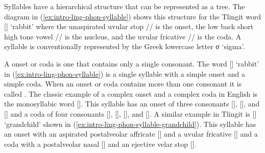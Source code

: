 Syllables have a hierarchical structure that can be represented as a tree.
The diagram in (\ref{ex:intro-ling-phon-syllable}) shows this structure for the Tlingit word  [] ‘rabbit’ where the unaspirated uvular stop // is the onset, the low back short high tone vowel // is the nucleus, and the uvular fricative // is the coda.
A syllable is conventionally represented by the Greek lowercase letter σ ‘sigma’.

\ex\label{ex:intro-ling-phon-syllable}%
%
\xe

A  onset or coda is one that contains only a single consonant.
The word  [] ‘rabbit’ in (\ref{ex:intro-ling-phon-syllable}) is a single syllable with a simple onset and a simple coda.
When an onset or coda contains more than one consonant it is called .
The classic example of a complex onset and a complex coda in English is the monosyllabic word  [].
This syllable has an onset of three consonants [], [], and [] and a coda of four consonants [], [], [], and [].
A similar example in Tlingit is  [] ‘grandchild’ shown in (\ref{ex:intro-ling-phon-syllable-grandchild}).
This syllable  has an onset with an aspirated postalveolar affricate [] and a uvular fricative [] and a coda with a postalveolar nasal [] and an ejective velar stop [].

